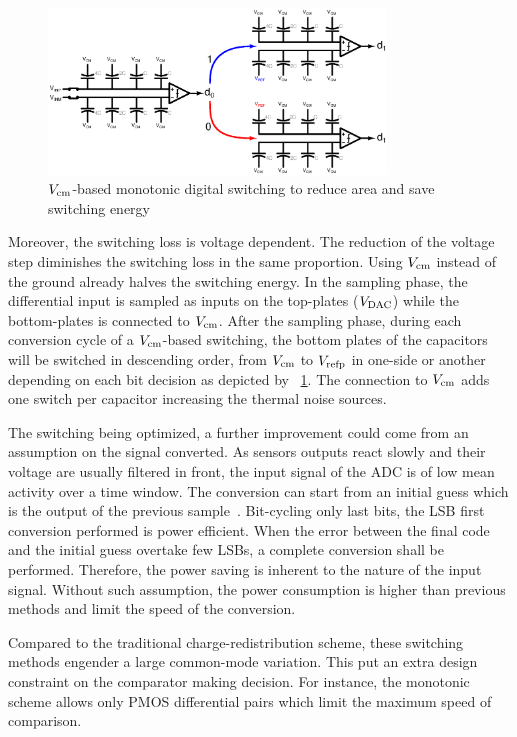 \begin{figure}[htp]
	\centering
	\includegraphics[width=0.8\textwidth]{Chapter3/Figs/sar_vcm_monotonic.ps}
	\caption{\(V_{\rm cm}\)-based monotonic digital switching to reduce area and save switching energy}
	\label{fig:sar_vcm_monotonic}
\end{figure}

Moreover, the switching loss is voltage dependent. The reduction of the voltage step diminishes the switching loss in the same proportion. Using \(V_{\rm cm}\) instead of the ground already halves the switching energy. In the sampling phase, the differential input is sampled as inputs on the top-plates (\(V_{\rm DAC}\)) while the bottom-plates is connected to \(V_{\rm cm}\). After the sampling phase, during each conversion cycle of a \(V_{\rm cm}\)-based switching, the bottom plates of the capacitors will be switched in descending order, from \(V_{\rm cm}\) to \(V_{\rm refp}\) in one-side or another depending on each bit decision as depicted by \figurename~\ref{fig:sar_vcm_monotonic}. The connection to \(V_{\rm cm}\) adds one switch per capacitor increasing the thermal noise sources.

The switching being optimized, a further improvement could come from an assumption on the signal converted. As sensors outputs react slowly and their voltage are usually filtered in front, the input signal of the ADC is of low mean activity over a time window. The conversion can start from an initial guess which is the output of the previous sample~\cite{Yaul2014}. Bit-cycling only last bits, the LSB first conversion performed is power efficient. When the error between the final code and the initial guess overtake few LSBs, a complete conversion shall be performed. Therefore, the power saving is inherent to the nature of the input signal. Without such assumption, the power consumption is higher than previous methods and limit the speed of the conversion.

Compared to the traditional charge-redistribution scheme, these switching methods engender a large common-mode variation. This put an extra design constraint on the comparator making decision. For instance, the monotonic scheme allows only PMOS differential pairs which limit the maximum speed of comparison. 

